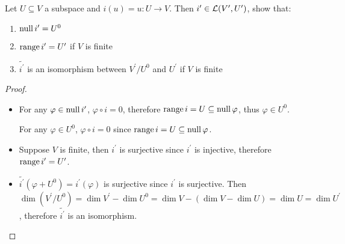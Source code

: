 \documentclass[../main.tex]{subfiles}
\begin{document}
\begin{exercise}
  Let $U \subseteq V$ a subspace and $i(u) = u : U \rightarrow V$. Then $i^\prime \in \mathcal{L}(V^\prime, U^\prime)$,
  show that:
  \begin{enumerate}
    \item $\operatorname{null} i^\prime = U^0$
    \item $\operatorname{range} i^\prime = U^\prime$ if $V$ is finite
    \item $\tilde{i^\prime}$ is an isomorphism between $V^\prime / U^0$ and $U^\prime$ if $V$ is finite
  \end{enumerate}
\end{exercise}
\begin{proof}
  ~
  \begin{itemize}
    \item For any $\varphi \in \operatorname{null} i^\prime$, $\varphi \circ i = 0$, therefore $\operatorname{range} i = U \subseteq \operatorname{null} \varphi$,
          thus $\varphi \in U^0$.

          For any $\varphi \in U^0$, $\varphi \circ i = 0$ since $\operatorname{range} i = U \subseteq \operatorname{null} \varphi$.
    \item Suppose $V$ is finite, then $i^\prime$ is surjective since $i^\prime$ is injective, therefore $\operatorname{range} i^\prime = U^\prime$.
    \item $\tilde{i^\prime}(\varphi + U^0) = i^\prime(\varphi)$ is surjective since $i^\prime$ is surjective.
          Then $\dim (V^\prime / U^0) = \dim V^\prime - \dim U^0 = \dim V - (\dim V - \dim U) = \dim U = \dim U^\prime$,
          therefore $\tilde{i^\prime}$ is an isomorphism.
  \end{itemize}
\end{proof}
\end{document}
